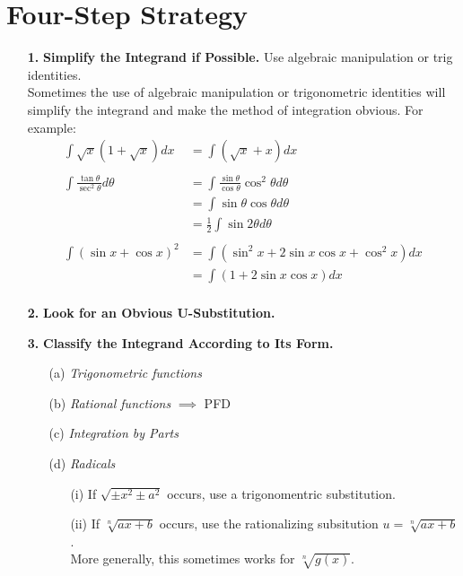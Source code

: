 \documentclass[paper=a4, fontsize=11pt]{scrartcl} %
\numberwithin{equation}{section} %
\numberwithin{figure}{section} %
\numberwithin{table}{section} %
\newcommand{\ds}{\displaystyle}
\begin{document}
\section*{Four-Step Strategy}
\begin{enumerate}
\item[\textbf{1.}] \textbf{Simplify the Integrand if Possible.} Use algebraic manipulation or trig identities.\\
Sometimes the use of algebraic manipulation or trigonometric identities will simplify the integrand and make the method of integration obvious. For example:\\
\indent
\begin{align*}
\ds\int \sqrt{x}(1+\sqrt{x})dx &= \ds\int (\sqrt{x} + x)dx\\
 \\
\ds\int \ds\frac{\tan\theta}{\sec^2\theta}d\theta &= \ds\int \ds\frac{\sin\theta}{\cos\theta}\cos^2\theta d\theta\\
&= \ds\int \sin \theta \cos \theta d\theta\\
&= \ds\frac{1}{2} \ds\int \sin 2\theta d\theta\\
\\
\ds\int (\sin x + \cos x)^2 &= \ds\int (\sin^2 x + 2\sin x \cos x + \cos^2 x)dx\\
&= \ds\int (1+2\sin x\cos x)dx\\
\end{align*}
\indent

\item[\textbf{2.}] \textbf{Look for an Obvious U-Substitution.}
%

\item[\textbf{3.}] \textbf{Classify the Integrand According to Its Form.}
\begin{enumerate}
\item[(a)] \textit{Trigonometric functions}\\
\item[(b)] \textit{Rational functions} $\implies$ PFD\\
\item[(c)] \textit{Integration by Parts}\\
\item[(d)] \textit{Radicals}\\
\begin{enumerate}
\item[(i)] If $\ds\sqrt{\pm x^2 \pm a^2}$ occurs, use a trigonomentric substitution.
\item[(ii)] If $\sqrt[n]{ax+b}$ occurs, use the rationalizing subsitution $u=\sqrt[n]{ax+b}$.\\
 More generally, this sometimes works for $\sqrt[n]{g(x)}$.\\
\end{enumerate}
\end{enumerate}


\end{enumerate}
\end{document}
